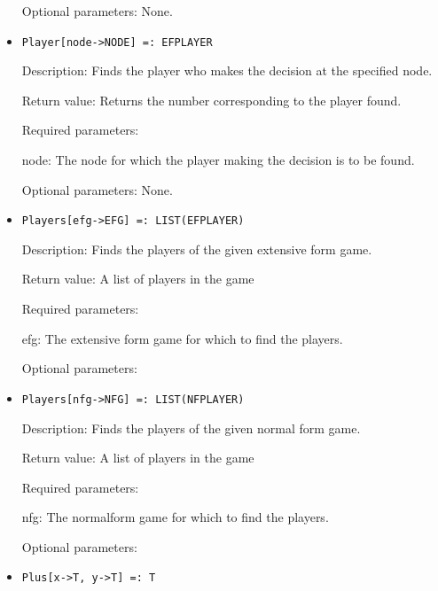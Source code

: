 \begin{itemize}
\item
[Optional parameters:] None.\hfil\null
\ed

\item
\protect \large \begin{verbatim}
Player[node->NODE] =: EFPLAYER
\end{verbatim}\normalsize

\bd
\item
[Description:] Finds the player who makes the decision at the
specified node.
\item
[Return value:] Returns the number corresponding to the player found.
\item
[Required parameters:]\hfil\null

\bd
\item
[node:] The node for which the player making the decision is to be found.
\ed

\item
[Optional parameters:] None.
\ed

\item
\protect \large \begin{verbatim}
Players[efg->EFG] =: LIST(EFPLAYER)
\end{verbatim} \normalsize

\bd
\item
[Description:] Finds the players of the given extensive form game. 
\item
[Return value:]  A list of players in the game
\item
[Required parameters:]
\bd
\item
[efg:] The extensive form game for which to find the players.  
\ed
\item
[Optional parameters:]
\ed

\item
\protect \large \begin{verbatim}
Players[nfg->NFG] =: LIST(NFPLAYER)
\end{verbatim} \normalsize

\bd
\item
[Description:] Finds the players of the given normal form game. 
\item
[Return value:]  A list of players in the game
\item
[Required parameters:]
\bd
\item
[nfg:] The normalform game for which to find the players.  
\ed
\item
[Optional parameters:]
\ed

\item 
\protect \large \begin{verbatim}
Plus[x->T, y->T] =: T
\end{verbatim} \normalsize


\end{itemize}
